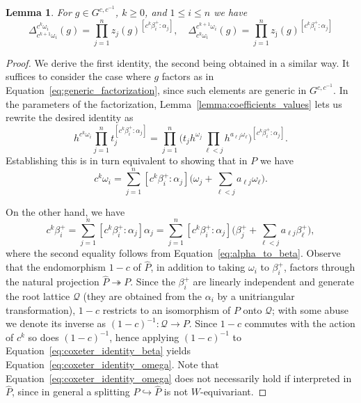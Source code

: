 \documentclass[12pt]{amsart}
\newcommand{\cQ}{\mathcal{Q}}
\newcommand\onto{\twoheadrightarrow}
\newcommand\into{\hookrightarrow}
\newcommand{\ol}[1]{\overline{#1}}
\newtheorem{lemma}[theorem]{Lemma}
\theoremstyle{remark}
\numberwithin{equation}{section}
\numberwithin{figure}{section}
\begin{document}
\begin{lemma}
  \label{lemma:coefficient_identity_powers}
  For $g \in G^{c,c^{-1}}$, $k \geq 0$, and $1 \leq i \leq n$ we have
  \begin{equation*}
    \Delta_{c^{k+1} \omega_i}^{c^k \omega_i}(g)
    =
    \prod_{j=1}^nz_j(g)^{[c^k\beta_i^+:\alpha_j]},\quad 
    \Delta_{c^k \omega_i}^{c^{k+1} \omega_i}(g)
    =
    \prod_{j=1}^nz_{\ol{\jmath}}(g)^{[c^k\beta_i^+:\alpha_j]}
  \end{equation*}
\end{lemma}
\begin{proof}
  We derive the first identity, the second being obtained in a similar way.
  It suffices to consider the case where $g$ factors as in Equation~\ref{eq:generic_factorization}, since such elements are generic in $G^{c,c^{-1}}$.
  In the parameters of the factorization, Lemma~\ref{lemma:coefficients_values} lets us rewrite the desired identity as
  \[
    h^{c^k\omega_i}\prod_{j=1}^n t_{j}^{[c^k\beta_i^+:\alpha_j]} 
    = 
    \prod_{j=1}^n\Big( t_j h^{\omega_j}\prod_{ \ell <j}h^{a_{\ell j}\omega_ \ell }\Big)^{[c^k\beta_i^+:\alpha_j]}.
  \]
  Establishing this is in turn equivalent to showing that in $P$ we have
  \begin{equation}\label{eq:coxeter_identity_omega}
    c^k\omega_i 
    =
    \sum_{j=1}^n
    [c^k\beta_i^+:\alpha_j]
    \Big(
    \omega_j+
    \sum_{\ell<j} a_{\ell j}\omega_\ell
    \Big).
  \end{equation}

  On the other hand, we have 
  \begin{equation}
    \label{eq:coxeter_identity_beta}
    c^k\beta_i^+ 
    = 
    \sum_{j=1}^n [c^k\beta_i^+:\alpha_j] \alpha_j
    = 
    \sum_{j=1}^n [c^k\beta_i^+:\alpha_j] \Big(\beta_j^+ + \sum_{\ell<j} a_{\ell j}\beta_\ell^+\Big),
  \end{equation}
  where the second equality follows from Equation~\ref{eq:alpha_to_beta}.
  Observe that the endomorphism $1-c$ of $\widehat{P}$, in addition to taking $\omega_i$ to $\beta_i^+$, factors through the natural projection $\widehat{P} \onto P$.
  Since the $\beta_i^+$ are linearly independent and generate the root lattice $\cQ$ (they are obtained from the $\alpha_i$ by a unitriangular transformation), $1-c$ restricts to an isomorphism of $P$ onto $\cQ$; with some abuse we denote its inverse as $(1-c)^{-1}: \cQ \to P$.
  Since $1-c$ commutes with the action of $c^{k}$ so does $(1-c)^{-1}$, hence applying $(1-c)^{-1}$ to Equation~\ref{eq:coxeter_identity_beta} yields Equation~\ref{eq:coxeter_identity_omega}.
  Note that Equation~\ref{eq:coxeter_identity_omega} does not necessarily hold if interpreted in $\widehat{P}$, since in general a splitting $P \into \widehat{P}$ is not $W$-equivariant.
\end{proof}
\end{document}
